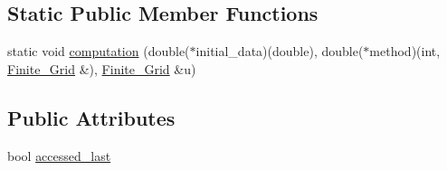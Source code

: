 \subsection*{Static Public Member Functions}
\begin{DoxyCompactItemize}
\item 
static void \hyperlink{classFinite__Grid_a6161d1e41e0002d1ddc253d7252dd739}{computation} (double($\ast$initial\-\_\-data)(double), double($\ast$method)(int, \hyperlink{classFinite__Grid}{Finite\-\_\-\-Grid} \&), \hyperlink{classFinite__Grid}{Finite\-\_\-\-Grid} \&u)
\end{DoxyCompactItemize}
\subsection*{Public Attributes}
\begin{DoxyCompactItemize}
\item 
bool \hyperlink{classFinite__Grid_a08a42cb21b0c78b53ee9585f35d94fa5}{accessed\-\_\-last}
\end{DoxyCompactItemize}


